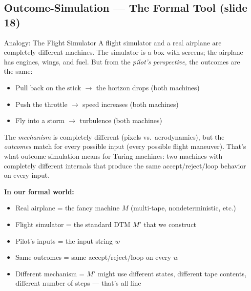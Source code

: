 \subsection{Outcome-Simulation --- The Formal Tool (slide 18)}

\begin{notebox}{Analogy: The Flight Simulator}
A flight simulator and a real airplane are completely different machines. The
simulator is a box with screens; the airplane has engines, wings, and fuel. But
from the \emph{pilot's perspective}, the outcomes are the same:
\begin{itemize}[nosep]
\item Pull back on the stick $\to$ the horizon drops (both machines)
\item Push the throttle $\to$ speed increases (both machines)
\item Fly into a storm $\to$ turbulence (both machines)
\end{itemize}

The \emph{mechanism} is completely different (pixels vs.\ aerodynamics), but
the \emph{outcomes} match for every possible input (every possible flight
maneuver). That's what outcome-simulation means for Turing machines: two
machines with completely different internals that produce the same
accept/reject/loop behavior on every input.

\textbf{In our formal world:}
\begin{itemize}[nosep]
\item Real airplane = the fancy machine $M$ (multi-tape, nondeterministic, etc.)
\item Flight simulator = the standard DTM $M'$ that we construct
\item Pilot's inputs = the input string $w$
\item Same outcomes = same accept/reject/loop on every $w$
\item Different mechanism = $M'$ might use different states, different tape
  contents, different number of steps --- that's all fine
\end{itemize}
\end{notebox}

